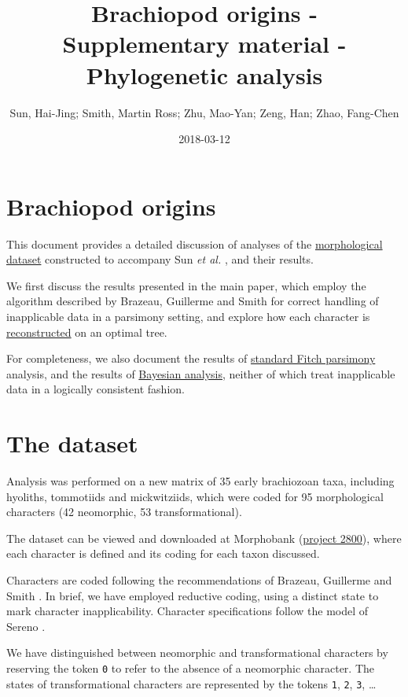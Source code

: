 \documentclass[]{book}
\title{Brachiopod origins - Supplementary material - Phylogenetic analysis}
\author{Sun, Hai-Jing; Smith, Martin Ross; Zhu, Mao-Yan; Zeng, Han; Zhao,
Fang-Chen}
\date{2018-03-12}
\theoremstyle{definition}
\theoremstyle{definition}
\theoremstyle{definition}
\theoremstyle{remark}
\begin{document}
\maketitle

{
\setcounter{tocdepth}{1}
\tableofcontents
}
\hypertarget{brachiopod-origins}{%
\chapter*{Brachiopod origins}\label{brachiopod-origins}}

This document provides a detailed discussion of analyses of the
\protect\hyperlink{dataset}{morphological dataset} constructed to
accompany Sun \emph{et al.} \citeyearpar{Sun2018}, and their results.

We first discuss the results presented in the main paper, which employ
the algorithm described by Brazeau, Guillerme and Smith
\citeyearpar{Brazeau2018} for correct handling of inapplicable data in a
parsimony setting, and explore how each character is
\protect\hyperlink{reconstructions}{reconstructed} on an optimal tree.

For completeness, we also document the results of
\protect\hyperlink{tnt}{standard Fitch parsimony} analysis, and the
results of \protect\hyperlink{MrBayes}{Bayesian analysis}, neither of
which treat inapplicable data in a logically consistent fashion.

\hypertarget{the-dataset}{%
\chapter{The dataset}\label{the-dataset}}

Analysis was performed on a new matrix of 35 early brachiozoan taxa,
including hyoliths, tommotiids and mickwitziids, which were coded for 95
morphological characters (42 neomorphic, 53 transformational).

The dataset can be viewed and downloaded at Morphobank
(\href{https://morphobank.org/permalink/?P2800}{project 2800}), where
each character is defined and its coding for each taxon discussed.

Characters are coded following the recommendations of Brazeau, Guillerme
and Smith \citep{Brazeau2018}. In brief, we have employed reductive
coding, using a distinct state to mark character inapplicability.
Character specifications follow the model of Sereno
\citeyearpar{Sereno2007}.

We have distinguished between neomorphic and transformational characters
\citep[sensu][]{Sereno2007} by reserving the token \texttt{0} to refer
to the absence of a neomorphic character. The states of transformational
characters are represented by the tokens \texttt{1}, \texttt{2},
\texttt{3}, \ldots{}
\end{document}
